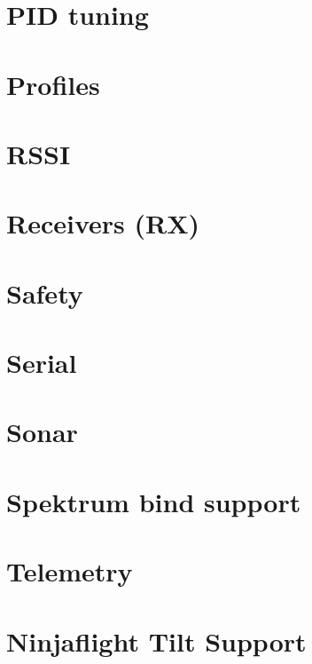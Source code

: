 \documentclass[twoside]{book}
\newcommand{\+}{\discretionary{\mbox{\scriptsize$\hookleftarrow$}}{}{}}
\begin{document}
\chapter{P\+I\+D tuning}
\label{md_docs_PID_tuning}
\hypertarget{md_docs_PID_tuning}{}

\chapter{Profiles}
\label{md_docs_Profiles}
\hypertarget{md_docs_Profiles}{}

\chapter{R\+S\+S\+I}
\label{md_docs_Rssi}
\hypertarget{md_docs_Rssi}{}

\chapter{Receivers (R\+X)}
\label{md_docs_Rx}
\hypertarget{md_docs_Rx}{}

\chapter{Safety}
\label{md_docs_Safety}
\hypertarget{md_docs_Safety}{}

\chapter{Serial}
\label{md_docs_Serial}
\hypertarget{md_docs_Serial}{}

\chapter{Sonar}
\label{md_docs_Sonar}
\hypertarget{md_docs_Sonar}{}

\chapter{Spektrum bind support}
\label{md_docs_Spektrum_bind}
\hypertarget{md_docs_Spektrum_bind}{}

\chapter{Telemetry}
\label{md_docs_Telemetry}
\hypertarget{md_docs_Telemetry}{}

\chapter{Ninjaflight Tilt Support}
\label{md_docs_tilt-props}
\hypertarget{md_docs_tilt-props}{}

\end{document}
